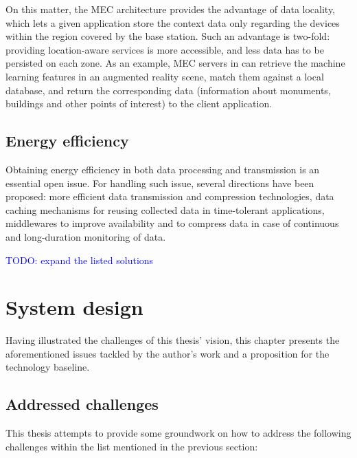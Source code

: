 On this matter, the MEC architecture provides the advantage of data locality, which lets a given application store the context data only regarding the devices within the region covered by the base station. Such an advantage is two-fold: providing location-aware services is more accessible, and less data has to be persisted on each zone. As an example, MEC servers in \cite{mobile-augmented-reality} can retrieve the machine learning features in an augmented reality scene, match them against a local database, and return the corresponding data (information about monuments, buildings and other points of interest) to the client application.

\subsection{Energy efficiency}

Obtaining energy efficiency in both data processing and transmission is an essential open issue. For handling such issue, several directions have been proposed: more efficient data transmission and compression technologies, data caching mechanisms for reusing collected data in time-tolerant applications, middlewares to improve availability and to compress data in case of continuous and long-duration monitoring of data.

\textcolor{blue}{TODO: expand the listed solutions}

\section{System design}
\label{sec:technicals}

Having illustrated the challenges of this thesis' vision, this chapter presents the aforementioned issues tackled by the author's work and a proposition for the technology baseline.

\subsection{Addressed challenges}

This thesis attempts to provide some groundwork on how to address the following challenges within the list mentioned in the previous section:


